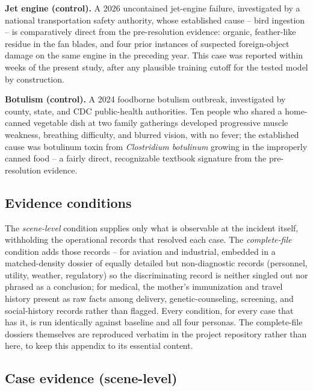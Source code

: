 \documentclass[11pt]{article}
\begin{document}
\textbf{Jet engine (control).} A 2026 uncontained jet-engine failure,
investigated by a national transportation safety authority, whose
established cause -- bird ingestion -- is comparatively direct from the
pre-resolution evidence: organic, feather-like residue in the fan blades,
and four prior instances of suspected foreign-object damage on the same
engine in the preceding year. This case was reported within weeks of the
present study, after any plausible training cutoff for the tested model
by construction.

\textbf{Botulism (control).} A 2024 foodborne botulism outbreak,
investigated by county, state, and CDC public-health authorities. Ten
people who shared a home-canned vegetable dish at two family gatherings
developed progressive muscle weakness, breathing difficulty, and blurred
vision, with no fever; the established cause was botulinum toxin from
\emph{Clostridium botulinum} growing in the improperly canned food -- a
fairly direct, recognizable textbook signature from the pre-resolution
evidence.

\subsection*{Evidence conditions}

The \emph{scene-level} condition supplies only what is observable at the
incident itself, withholding the operational records that resolved each
case. The \emph{complete-file} condition adds those records -- for
aviation and industrial, embedded in a matched-density dossier of equally
detailed but non-diagnostic records (personnel, utility, weather,
regulatory) so the discriminating record is neither singled out nor
phrased as a conclusion; for medical, the mother's immunization and
travel history present as raw facts among delivery, genetic-counseling,
screening, and social-history records rather than flagged. Every
condition, for every case that has it, is run identically against
baseline and all four personas. The complete-file dossiers themselves are
reproduced verbatim in the project repository rather than here, to keep
this appendix to its essential content.

\subsection*{Case evidence (scene-level)}
\end{document}
